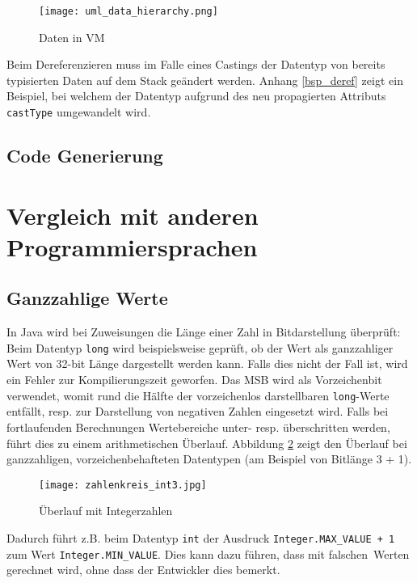 \documentclass[10pt, a4paper, twocolumn]{article} %
\begin{document}
\begin{figure}[H]
    \texttt{[image: uml\_data\_hierarchy.png]} %
    \caption{Daten in VM} %
    \label{data_hierarchy}
\end{figure}

Beim Dereferenzieren muss im Falle eines Castings der Datentyp von bereits typisierten Daten auf dem Stack geändert werden.
Anhang \ref{bsp_deref} zeigt ein Beispiel, bei welchem der Datentyp aufgrund des neu propagierten Attributs \texttt{castType} umgewandelt wird.

\subsection{Code Generierung}

\section{Vergleich mit anderen Programmiersprachen}
\subsection{Ganzzahlige Werte}
In Java wird bei Zuweisungen die Länge einer Zahl in Bitdarstellung überprüft:
Beim Datentyp \texttt{long} wird beispielsweise geprüft, ob der Wert als ganzzahliger Wert von 32-bit Länge dargestellt werden kann.
Falls dies nicht der Fall ist, wird ein Fehler zur Kompilierungszeit geworfen.
Das MSB wird als Vorzeichenbit verwendet, womit rund die Hälfte der vorzeichenlos darstellbaren \texttt{long}-Werte entfällt, resp. zur Darstellung von negativen Zahlen eingesetzt wird.
Falls bei fortlaufenden Berechnungen Wertebereiche unter- resp. überschritten werden, führt dies zu einem arithmetischen Überlauf.
Abbildung \ref{zahlenkreis}
zeigt den Überlauf bei ganzzahligen, vorzeichenbehafteten Datentypen (am Beispiel von Bitlänge 3 + 1).

\begin{figure}[H]
    \texttt{[image: zahlenkreis\_int3.jpg]}
    \caption{Überlauf mit Integerzahlen}
    \label{zahlenkreis}
\end{figure}

Dadurch führt z.B. beim Datentyp \texttt{int} der Ausdruck \texttt{Integer.MAX\_VALUE + 1} zum Wert \texttt{Integer.MIN\_VALUE}.
Dies kann dazu führen, dass mit \glqq falschen\grqq \ Werten gerechnet wird, ohne dass der Entwickler dies bemerkt.
\end{document}
